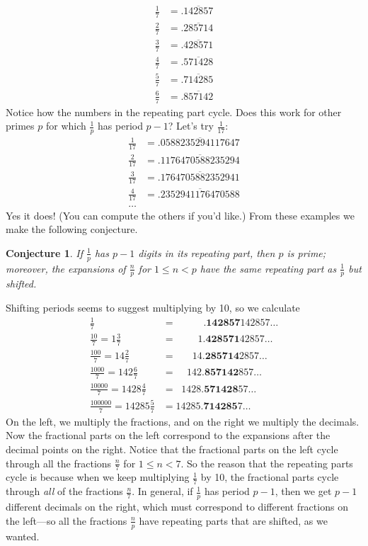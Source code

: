 \documentclass[12pt,twoside]{article}
\theoremstyle{norm}
\newtheorem{conj}[thm]{Conjecture}
\newcommand{\rc}[1]{\frac{1}{#1}}
\begin{document}
\begin{align*}
\frac{1}{7}&=.\overline{142857}\\
\frac{2}{7}&=.\overline{285714}\\
\frac{3}{7}&=.\overline{428571}\\
\frac{4}{7}&=.\overline{571428}\\
\frac{5}{7}&=.\overline{714285}\\
\frac{6}{7}&=.\overline{857142}
\end{align*}
Notice how the numbers in the repeating part cycle. Does this work for other primes $p$ for which $\rc{p}$ has period $p-1$? Let's try $\frac{1}{17}$:
\begin{align*}
\frac{1}{17}&=.\overline{0588235294117647}\\
\frac{2}{17}&=.\overline{1176470588235294}\\
\frac{3}{17}&=.\overline{1764705882352941}\\
\frac{4}{17}&=.\overline{2352941176470588}\\
\ldots
\end{align*}
Yes it does! (You can compute the others if you'd like.) From these examples we make the following conjecture.
\begin{conj}
If $\rc{p}$ has $p-1$ digits in its repeating part, then $p$ is prime; moreover, the expansions of $\frac{n}{p}$ for $1\leq n<p$ have the same repeating part as $\rc{p}$ but shifted.
\end{conj}
Shifting periods seems to suggest multiplying by 10, so we calculate
\begin{align*}
\frac{1}{7}&=\;\;\;\;\;\;\;\;\;\;.\mathbf{142857}142857\ldots\\
\frac{10}{7}=1\frac{3}{7}&=\;\;\;\;\;\;\;\;1.\mathbf{428571}42857\ldots\\
\frac{100}{7}=14\frac{2}{7}&=\;\;\;\;\;\;14.\mathbf{285714}2857\ldots\\
\frac{1000}{7}=142\frac{6}{7}&=\;\;\;\;142.\mathbf{857142}857\ldots\\
\frac{10000}{7}=1428\frac{4}{7}&=\;\;1428.\mathbf{571428}57\ldots\\
\frac{100000}{7}=14285\frac{5}{7}&=14285.\mathbf{714285}7\ldots
\end{align*}
On the left, we multiply the fractions, and on the right we multiply the decimals. Now the fractional parts on the left correspond to the expansions after the decimal points on the right. Notice that the fractional parts on the left cycle through all the fractions $\frac n7$ for $1\leq n<7$. So the reason that the repeating parts cycle is because when we keep  multiplying $\frac 17$ by 10, the fractional parts cycle through {\it all} of the fractions $\frac n7$. In general, if $\rc p$ has period $p-1$, then we get $p-1$ different decimals on the right, which must correspond to different fractions on the left---so all the fractions $\frac np$ have repeating parts that are shifted, as we wanted.
\end{document}
